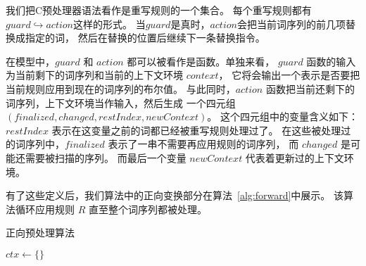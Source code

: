 我们把C预处理器语法看作是重写规则的一个集合。
每个重写规则都有$guard \hookrightarrow action$这样的形式。
当$guard$是真时，$action$会把当前词序列的前几项替换成指定的词，
然后在替换的位置后继续下一条替换指令。

在模型中，$guard$ 和 $action$ 都可以被看作是函数。单独来看，
$guard$ 函数的输入为当前剩下的词序列和当前的上下文环境 $context$，
它将会输出一个表示是否要把当前规则应用到现在的词序列的布尔值。
与此同时，$action$ 函数把当前还剩下的词序列，上下文环境当作输入，然后生成
一个四元组 $(finalized, changed, 
restIndex, newContext)$。
这个四元组中的变量含义如下：
$restIndex$ 表示在这变量之前的词都已经被重写规则处理过了。
在这些被处理过的词序列中，$finalized$ 表示了一串不需要再应用规则的词序列，
而 $changed$ 是可能还需要被扫描的序列。
而最后一个变量 $newContext$ 代表着更新过的上下文环境。

有了这些定义后，我们算法中的正向变换部分在算法~\ref{alg:forward}中展示。
该算法循环应用规则 $R$ 直至整个词序列都被处理。



\begin{algorithm}
  \newcommand\mycommfont[1]{\rmfamily{#1}}
  \caption{正向预处理算法  \label{alg:forward}}
  $ctx \leftarrow \{\}$\;
\end{algorithm}

